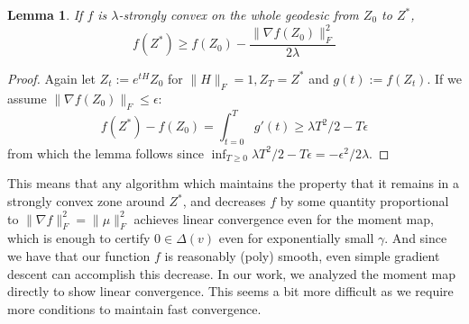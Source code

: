 \documentclass{article}
\newtheorem{lemma}[theorem]{Lemma}
\begin{document}
\begin{lemma}
If $f$ is $\lambda$-strongly convex on the whole geodesic from $Z_{0}$ to $Z^{*}$, 
\[ f(Z^{*}) \geq f(Z_{0}) -  \frac{\|\nabla f(Z_{0})\|_{F}^{2}}{2 \lambda}  \]
\end{lemma}
\begin{proof}
Again let $Z_{t} := e^{tH} Z_{0}$ for $\|H\|_{F} = 1, Z_{T} = Z^{*}$ and $g(t) := f(Z_{t})$. If we assume $\|\nabla f(Z_{0})\|_{F} \leq \epsilon$:
\[ f(Z^{*}) - f(Z_{0}) = \int_{t=0}^{T} g'(t) \geq \lambda T^{2}/2 - T \epsilon \]
from which the lemma follows since $\inf_{T \geq 0} \lambda T^{2}/2 - T \epsilon = - \epsilon^{2}/2 \lambda$. 
\end{proof}
This means that any algorithm which maintains the property that it remains in a strongly convex zone around $Z^{*}$, and decreases $f$ by some quantity proportional to $\|\nabla f\|_{F}^{2} = \|\mu\|_{F}^{2}$ achieves linear convergence even for the moment map, which is enough to certify $0 \in \Delta(v)$ even for exponentially small $\gamma$. And since we have that our function $f$ is reasonably (poly) smooth, even simple gradient descent can accomplish this decrease. In our work, we analyzed the moment map directly to show linear convergence. This seems a bit more difficult as we require more conditions to maintain fast convergence. 
\end{document}
